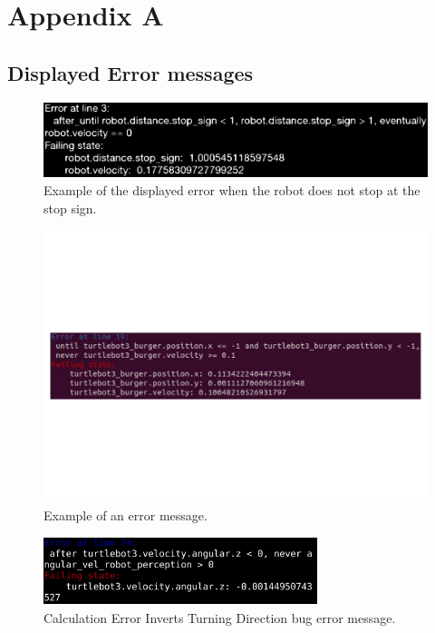 \chapter*{Appendix A}
\label{app:appendix-A}

\section{Displayed Error messages}

\begin{figure}
\includegraphics[width=\textwidth]{images/error.eps}
\caption{Example of the displayed error when the robot does not stop at the stop sign.}
\end{figure}

\begin{figure}[h]
\includegraphics[width=\textwidth]{images/error_message.pdf}
\caption{Example of an error message.}
\end{figure}

\begin{figure}
\begin{center}
\includegraphics[width=8cm,height=2cm,keepaspectratio,]{images/erreval1.png}
\caption{Calculation Error Inverts Turning Direction bug error message.}
\end{center}
\end{figure}

